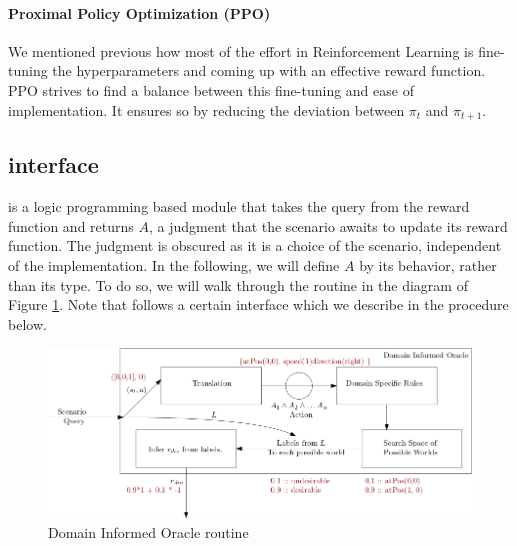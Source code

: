 \paragraph{Proximal Policy Optimization (PPO)}
We mentioned previous how most of the effort in Reinforcement Learning is fine-tuning the hyperparameters 
and coming up with an effective reward function. PPO strives to find a balance between this fine-tuning and ease of implementation. It ensures so 
by reducing the deviation between $\pi_t$ and $\pi_{t+1}$. 


\subsection{\dio{} interface} \label{scspecs}
\dio{} is a logic programming based module that takes the query from the reward function and returns $A$, a judgment that the scenario awaits to update its reward function. The judgment is obscured as it is a choice of the scenario, 
independent of the \dio{} implementation. In the following, we will define $A$ by its behavior, rather than its type. To do so, we will walk through the routine in the diagram of Figure \ref{fig:diospecs}.
Note that \dio{} follows a certain interface which we describe in the procedure below.

\begin{figure}[H]
  \centering
  \includegraphics[scale=0.46]{figures/diospecs.png}
  \caption{Domain Informed Oracle routine}
  \label{fig:diospecs}
\end{figure}

